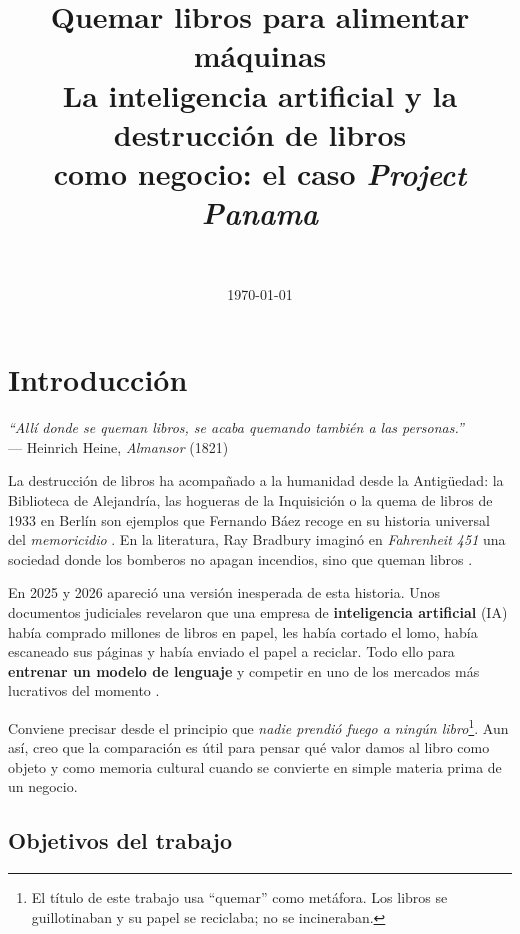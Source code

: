 \documentclass[11pt,a4paper,twoside,openright]{book}
\title{\logoumu
       \Huge\textbf{Quemar libros para alimentar máquinas}\\[0.6em]
       \Large La inteligencia artificial y la destrucción de libros\\
       como negocio: el caso \textit{Project Panama}}
\author{\autor\\[0.3em]\normalsize \asignatura}
\date{\today}
\begin{document}
\frontmatter
\maketitle

\tableofcontents
\listoffigures
\listoftables

\mainmatter

\chapter{Introducción}

\begin{flushright}
\small\textit{``Allí donde se queman libros, se acaba quemando también a las personas.''}\\
--- Heinrich Heine, \textit{Almansor} (1821)
\end{flushright}

La destrucción de libros ha acompañado a la humanidad desde la Antigüedad: la
Biblioteca de Alejandría, las hogueras de la Inquisición o la quema de libros de
1933 en Berlín son ejemplos que Fernando Báez recoge en su historia universal del
\textit{memoricidio} \cite{baez2004}. En la literatura, Ray Bradbury imaginó en
\textit{Fahrenheit 451} una sociedad donde los bomberos no apagan incendios, sino
que queman libros \cite{bradbury1953}.

En 2025 y 2026 apareció una versión inesperada de esta historia. Unos documentos
judiciales revelaron que una empresa de \textbf{inteligencia artificial} (IA)
había comprado millones de libros en papel, les había cortado el lomo, había
escaneado sus páginas y había enviado el papel a reciclar. Todo ello para
\textbf{entrenar un modelo de lenguaje} y competir en uno de los mercados más
lucrativos del momento \cite{arstechnica2025,euronews2026}.

Conviene precisar desde el principio que \emph{nadie prendió fuego a ningún
libro}\footnote{El título de este trabajo usa ``quemar'' como metáfora. Los libros
se guillotinaban y su papel se reciclaba; no se incineraban.}. Aun así, creo que
la comparación es útil para pensar qué valor damos al libro como objeto y como
memoria cultural cuando se convierte en simple materia prima de un negocio.

\section{Objetivos del trabajo}
\end{document}
